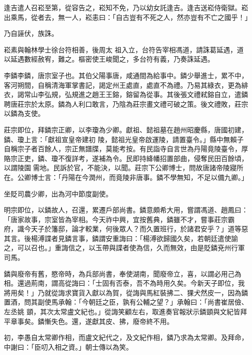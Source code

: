 \begin{pinyinscope}
 逢吉遣人召崧至第，從容告之，崧知不免，乃以幼女託逢吉。逢吉送崧侍衛獄。崧出乘馬，從者去，無一人，崧恚曰：「自古豈有不死之人，然亦豈有不亡之國乎！」



 乃自誣伏，族誅。



 崧素與翰林學士徐台符相善，後周太
 祖入立，台符告宰相馮道，請誅葛延遇，道以延遇數經赦宥，難之。樞密使王峻聞之，多台符有義，乃奏誅延遇。



 李鏻李鏻，唐宗室子也。其伯父陽事唐，咸通間為給事中。鏻少舉進士，累不中，客河朔間，自稱清海軍掌書記，謁定州王處直，處直不為禮。乃易其綠衣，更為緋衣，謁常山李弘規，弘規進之趙王王鎔，鎔留為從事。其後張文禮弒鎔自立，遣鏻聘唐莊宗於太原。鏻為人利口敢言，乃陰為莊宗畫文禮可破之策。後文禮敗，莊宗以鏻為支使。



 莊宗即位，拜鏻宗正卿，以李瓊為少卿。獻祖、懿祖墓在趙州昭慶縣，唐國初建，鏻、瓊上言：「獻祖宣皇帝建初
 陵，懿祖光皇帝啟運陵，請置臺令。」縣中無賴子自稱宗子者百餘人，宗正無譜牒，莫能考按。有民詣寺自言世為丹陽竟陵臺令，厚賂宗正吏，鏻、瓊不復詳考，遂補為令。民即持絳幡招置部曲，侵奪民田百餘頃，以謂陵園需地。民訴於官，不能決，以聞。莊宗下公卿博士，問故唐諸帝陵寢所在。公卿博士言：「丹陽在今潤州，而竟陵非唐事。鏻不學無知，不足以備九卿。」



 坐貶司農少卿，出為河中節度副使。



 明宗即位，以鏻故人，召還，累遷戶部尚書。鏻意頗希大用，嘗謂馮道、趙鳳曰：「唐家故事，宗室皆為宰相。今天祚中興，宜按舊典，鏻雖不才，嘗事莊宗霸
 府，識今天子於籓邸，論才較業，何後眾人？而久置班行，於諸君安乎？」道等惡其言。後楊溥諜者見鏻言事，鏻謂安重誨曰：「楊溥欲歸國久矣，若朝廷遣使諭之，可以召也。」重誨信之，以玉帶與諜者使為信，久而無效，由是貶鏻兗州行軍司馬。



 鏻與廢帝有舊，愍帝時，為兵部尚書，奉使湖南，聞廢帝立，喜，以謂必用己為相。還過荊南，謂高從誨曰：「士固有否泰，吾不為時用久矣。今新天子即位，我將用矣！」乃就從誨求寶貨入獻以為賀，從誨與馬紅裝拂二、猓犬然皮一，因為鏻置酒，問其副使馬承翰：「今朝廷之臣，孰有公輔之望？」承翰曰：「尚書崔居儉、左丞姚
 顗，其次太常盧文紀也。」從誨笑顧左右，取進奏官報狀示鏻顗與文紀皆拜平章事矣。鏻慚失色。還，遂獻其皮、拂，廢帝終不用。



 初，李愚自太常卿作相，而盧文紀代之，及文紀作相，鏻乃求為太常卿。及拜命，中謝曰：「臣叨入相之資。」朝士傳以為笑。




\end{pinyinscope}
